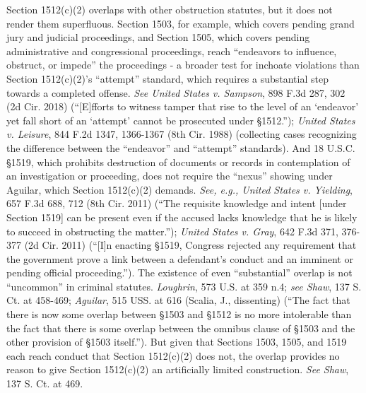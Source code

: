 Section 1512(c)(2) overlaps with other obstruction statutes, but it does not render them superfluous.
Section 1503, for example, which covers pending grand jury and judicial proceedings, and Section 1505, which covers pending administrative and congressional proceedings, reach “endeavors to influence, obstruct, or impede” the proceedings - a broader test for inchoate violations than Section 1512(c)(2)’s “attempt” standard, which requires a substantial step towards a completed offense.
\textit{See United States v. Sampson}, 898 F.3d 287, 302 (2d Cir. 2018) (“[E]fforts to witness tamper that rise to the level of an ‘endeavor’ yet fall short of an ‘attempt’ cannot be prosecuted under \S 1512.”);
\textit{United States v. Leisure}, 844 F.2d 1347, 1366-1367 (8th Cir. 1988) (collecting cases recognizing the difference between the “endeavor” and “attempt” standards).
And 18 U.S.C. \S 1519, which prohibits destruction of documents or records in contemplation of an investigation or proceeding, does not require the “nexus” showing under Aguilar, which Section 1512(c)(2) demands.
\textit{See, e.g., United States v. Yielding}, 657 F.3d 688, 712 (8th Cir. 2011) (“The requisite knowledge and intent [under Section 1519] can be present even if the accused lacks knowledge that he is likely to succeed in obstructing the matter.”);
\textit{United States v. Gray}, 642 F.3d 371, 376-377 (2d Cir. 2011) (“[I]n enacting \S 1519, Congress rejected any requirement that the government prove a link between a defendant’s conduct and an imminent or pending official proceeding.”).
The existence of even “substantial” overlap is not “uncommon” in criminal statutes.
\textit{Loughrin}, 573 U.S. at 359 n.4;
\textit{see Shaw}, 137 S. Ct. at 458-469;
\textit{Aguilar}, 515 USS. at 616 (Scalia, J., dissenting) (“The fact that there is now some overlap between \S 1503 and \S 1512 is no more intolerable than the fact that there is some overlap between the omnibus clause of \S 1503 and the other provision of \S 1503 itself.”).
But given that Sections 1503, 1505, and 1519 each reach conduct that Section 1512(c)(2) does not, the overlap provides no reason to give Section 1512(c)(2) an artificially limited construction.
\textit{See Shaw}, 137 S. Ct. at 469.%
